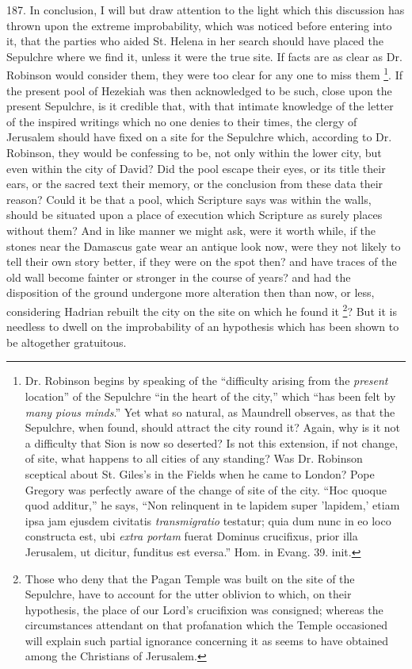 187.
In conclusion, I will but draw attention to the light which this
discussion has thrown upon the extreme improbability, which was
noticed before entering into it, that the parties who aided St. Helena
in her search should have placed the Sepulchre where we find it,
unless it were the true site. If facts are as clear as Dr. Robinson
would consider them, they were too clear for any one to miss them \footnote{Dr. Robinson begins by speaking of the ``difficulty arising from the \emph{present}
location'' of the Sepulchre ``in the heart of the city,'' which ``has been
felt by \emph{many pious minds}.'' Yet what so natural, as Maundrell
observes, as that the Sepulchre, when found, should attract the city
round it? Again, why is it not a difficulty that Sion is now so
deserted? Is not this extension, if not change, of site, what happens
to all cities of any standing? Was Dr. Robinson sceptical about St.
Giles's in the Fields when he came to London? Pope Gregory was
perfectly aware of the change of site of the city. ``Hoc quoque quod
additur,'' he says, ``Non relinquent in te lapidem super 'lapidem,'
etiam ipsa jam ejusdem civitatis \emph{transmigratio} testatur; quia
dum nunc in eo loco constructa est, ubi \emph{extra portam} fuerat
Dominus crucifixus, prior illa Jerusalem, ut dicitur, funditus est
eversa.'' Hom. in Evang. 39. init.}. If the present pool of Hezekiah was then acknowledged to be
such, close upon the present Sepulchre, is it credible that, with that
intimate knowledge of the letter of the inspired writings which no one
denies to their times, the clergy of Jerusalem should have fixed on a
site for the Sepulchre which, according to Dr. Robinson, they would be
confessing to be, not only within the lower city, but even within the
city of David? Did the pool escape their eyes, or its title their
ears, or the sacred text their memory, or the conclusion from these data their reason? Could it be that a pool, which Scripture says
was within the walls, should be situated upon a place of execution
which Scripture as surely places without them? And in like manner we
might ask, were it worth while, if the stones near the Damascus gate
wear an antique look now, were they not likely to tell their own story
better, if they were on the spot then? and have traces of the old wall
become fainter or stronger in the course of years? and had the
disposition of the ground undergone more alteration then than now, or
less, considering Hadrian rebuilt the city on the site on which he
found it \footnote{Those who deny that the Pagan Temple was built on the site of the
Sepulchre, have to account for the utter oblivion to which, on their
hypothesis, the place of our Lord's crucifixion was consigned; whereas
the circumstances attendant on that profanation which the Temple
occasioned will explain such partial ignorance concerning it as seems
to have obtained among the Christians of Jerusalem.}? But it is
needless to dwell on the improbability of an hypothesis which has been
shown to be altogether gratuitous.

